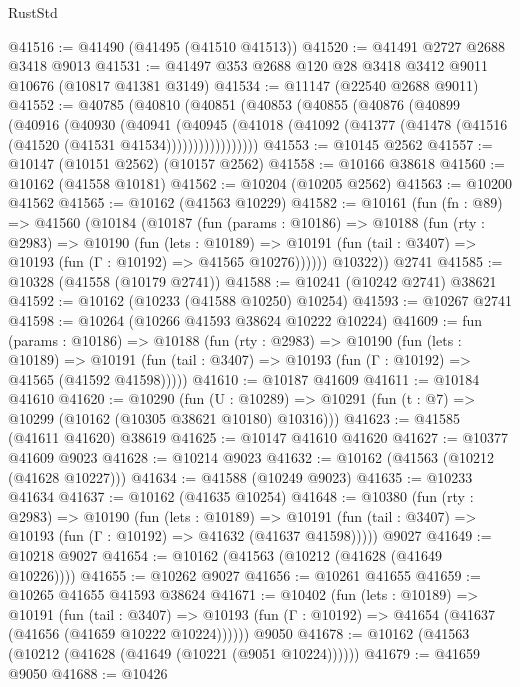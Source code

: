 \begin{lexlean}{RustStd}
\begin{coremodule}
@41516 := @41490 (@41495 (@41510 @41513))
@41520 := @41491 @2727 @2688 @3418 @9013
@41531 := @41497 @353 @2688 @120 @28 @3418 @3412 @9011 @10676 (@10817 @41381 @3149)
@41534 := @11147 (@22540 @2688 @9011)
@41552 := @40785
    (@40810
      (@40851
        (@40853
          (@40855
            (@40876
              (@40899
                (@40916
                  (@40930
                    (@40941
                      (@40945
                        (@41018
                          (@41092 (@41377 (@41478 (@41516 (@41520 (@41531 @41534)))))))))))))))))
@41553 := @10145 @2562
@41557 := @10147 (@10151 @2562) (@10157 @2562)
@41558 := @10166 @38618
@41560 := @10162 (@41558 @10181)
@41562 := @10204 (@10205 @2562)
@41563 := @10200 @41562
@41565 := @10162 (@41563 @10229)
@41582 := @10161
    (fun (fn : @89) =>
    @41560
      (@10184
        (@10187
          (fun (params : @10186) =>
          @10188
            (fun (rty : @2983) =>
            @10190
              (fun (lets : @10189) =>
              @10191 (fun (tail : @3407) => @10193 (fun (Γ : @10192) => @41565 @10276))))))
        @10322))
    @2741
@41585 := @10328 (@41558 (@10179 @2741))
@41588 := @10241 (@10242 @2741) @38621
@41592 := @10162 (@10233 (@41588 @10250) @10254)
@41593 := @10267 @2741
@41598 := @10264 (@10266 @41593 @38624 @10222 @10224)
@41609 := fun (params : @10186) =>
  @10188
    (fun (rty : @2983) =>
    @10190
      (fun (lets : @10189) =>
      @10191 (fun (tail : @3407) => @10193 (fun (Γ : @10192) => @41565 (@41592 @41598)))))
@41610 := @10187 @41609
@41611 := @10184 @41610
@41620 := @10290
    (fun (U : @10289) => @10291 (fun (t : @7) => @10299 (@10162 (@10305 @38621 @10180) @10316)))
@41623 := @41585 (@41611 @41620) @38619
@41625 := @10147 @41610 @41620
@41627 := @10377 @41609 @9023
@41628 := @10214 @9023
@41632 := @10162 (@41563 (@10212 (@41628 @10227)))
@41634 := @41588 (@10249 @9023)
@41635 := @10233 @41634
@41637 := @10162 (@41635 @10254)
@41648 := @10380
    (fun (rty : @2983) =>
    @10190
      (fun (lets : @10189) =>
      @10191 (fun (tail : @3407) => @10193 (fun (Γ : @10192) => @41632 (@41637 @41598)))))
    @9027
@41649 := @10218 @9027
@41654 := @10162 (@41563 (@10212 (@41628 (@41649 @10226))))
@41655 := @10262 @9027
@41656 := @10261 @41655
@41659 := @10265 @41655 @41593 @38624
@41671 := @10402
    (fun (lets : @10189) =>
    @10191
      (fun (tail : @3407) =>
      @10193 (fun (Γ : @10192) => @41654 (@41637 (@41656 (@41659 @10222 @10224))))))
    @9050
@41678 := @10162 (@41563 (@10212 (@41628 (@41649 (@10221 (@9051 @10224))))))
@41679 := @41659 @9050
@41688 := @10426

\end{coremodule}
\end{lexlean}
